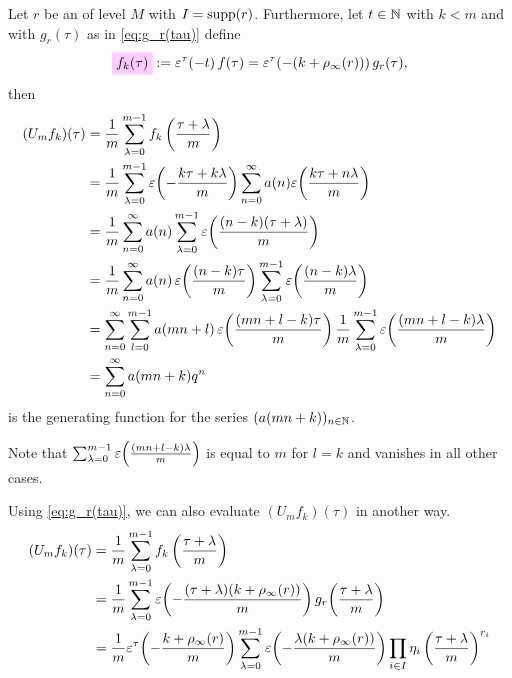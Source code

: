 \documentclass{article}
\begin{document}
Let $r$ be an  of level $M$ with
$I=\operatorname{supp}(r)$.
%
Furthermore, let $t \in \mathbb{N}$ with $k < m$ and with $g_r(\tau)$ as in
\ref{eq:g_r(tau)} define
\begin{gather}
  \defineNotation[f-k(tau)]{f_k(\tau)}
  :=\unityPowerTau{-t}f(\tau)
  = \unityPowerTau{-(k + \rho_\infty(r))} g_r(\tau),
  \label{eq:f_k(tau}
\end{gather}
then
\begin{align}
  (U_mf_k)(\tau)
  &=
  \frac{1}{m} \sum_{\lambda=0}^{m-1}f_k\left(\frac{\tau+\lambda}{m}\right)
  \notag
  \\
  &=
  \frac{1}{m} \sum_{\lambda=0}^{m-1}
  \varepsilon\!\left(-\frac{k\tau+k\lambda}{m}\right)
  \sum_{n=0}^\infty a(n) \varepsilon\!\left(\frac{k\tau+n\lambda}{m}\right)
  \notag
  \\
  &=
  \frac{1}{m}
  \sum_{n=0}^\infty
  a(n)
  \sum_{\lambda=0}^{m-1}
  \varepsilon\!\left(\frac{(n-k)(\tau+\lambda)}{m}\right)
  \notag
  \\
  &=
  \frac{1}{m}
  \sum_{n=0}^\infty
  a(n)\,
  \varepsilon\!\left(\frac{(n-k)\tau}{m}\right)
  \sum_{\lambda=0}^{m-1}
  \varepsilon\!\left(\frac{(n-k)\lambda}{m}\right)
  \notag
  \\
  &=
    \sum_{n=0}^\infty
    \sum_{l=0}^{m-1} a(mn+l)\,
    \varepsilon\!\left(\frac{(mn+l-k)\tau}{m}\right)
    \frac{1}{m}
    \sum_{\lambda=0}^{m-1}\varepsilon\!\left(\frac{(mn+l-k)\lambda}{m}\right)
    \notag
  \\
  &=
    \sum_{n=0}^\infty a(mn+k) q^n
  \label{eq:U_m-f_k}
\end{align}
is the generating function for the series
$(a(mn+k))_{n\in\mathbb{N}}$.


Note that
$\sum_{\lambda=0}^{m-1}\varepsilon\!\left(\frac{(mn+l-k)\lambda}{m}\right)$ is
equal to $m$ for $l=k$ and vanishes in all other cases.

Using \eqref{eq:g_r(tau)}, we can also evaluate $(U_mf_k)(\tau)$ in
another way.
%
\begin{align*}
  (U_mf_k)(\tau)
  &=
  \frac{1}{m} \sum_{\lambda=0}^{m-1}f_k\left(\frac{\tau+\lambda}{m}\right)\\
  &=
    \frac{1}{m} \sum_{\lambda=0}^{m-1}
    \varepsilon\!\left(-\frac{(\tau+\lambda) (k + \rho_\infty(r))}{m}\right)
    g_r\!\left(\frac{\tau+\lambda}{m}\right)
  \\
  &=
  \frac{1}{m}
  \varepsilon^\tau\!\left(-\frac{k+\rho_\infty(r)}{m}\right)
  \sum_{\lambda=0}^{m-1}
  \varepsilon\!\left(-\frac{\lambda (k+\rho_\infty(r))}{m}\right)
    \prod_{i\in I} \eta_i\left(\frac{\tau+\lambda}{m}\right)^{r_i}
\end{align*}
\end{document}
